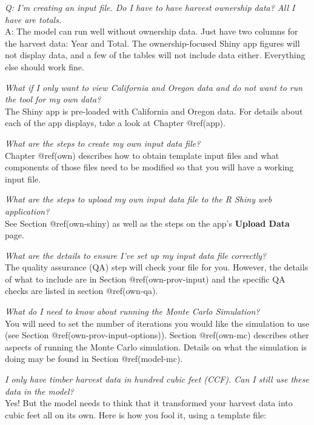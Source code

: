\documentclass[
  openany]{book}
\begin{document}
\emph{Q: I'm creating an input file. Do I have to have harvest ownership
data? All I have are totals.}\\
A: The model can run well without ownership data. Just have two columns
for the harvest data: Year and Total. The ownership-focused Shiny app
figures will not display data, and a few of the tables will not include
data either. Everything else should work fine.

\emph{What if I only want to view California and Oregon data and do not
want to run the tool for my own data?}\\
The Shiny app is pre-loaded with California and Oregon data. For details
about each of the app displays, take a look at Chapter @ref(app).

\emph{What are the steps to create my own input data file?}\\
Chapter @ref(own) describes how to obtain template input files and what
components of those files need to be modified so that you will have a
working input file.

\emph{What are the steps to upload my own input data file to the R Shiny
web application?}\\
See Section @ref(own-shiny) as well as the steps on the app's
\textbf{Upload Data} page.

\emph{What are the details to ensure I've set up my input data file
correctly? }\\
The quality assurance (QA) step will check your file for you. However,
the details of what to include are in Section @ref(own-prov-input) and
the specific QA checks are listed in section @ref(own-qa).

\emph{What do I need to know about running the Monte Carlo Simulation?
}\\
You will need to set the number of iterations you would like the
simulation to use (see Section @ref(own-prov-input-options)). Section
@ref(own-mc) describes other aspects of running the Monte Carlo
simulation. Details on what the simulation is doing may be found in
Section @ref(model-mc).

\emph{I only have timber harvest data in hundred cubic feet (CCF). Can I
still use these data in the model?}\\
Yes! But the model needs to think that it transformed your harvest data
into cubic feet all on its own. Here is how you fool it, using a
template file:
\end{document}
